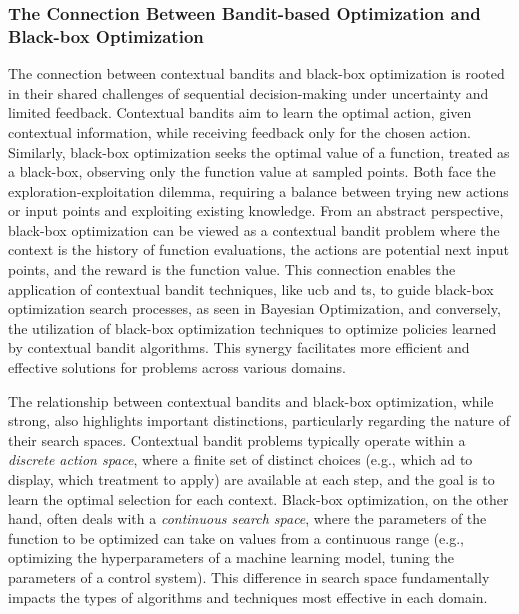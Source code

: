 \subsubsection{The Connection Between Bandit-based Optimization and Black-box Optimization}
The connection between contextual bandits and black-box optimization is rooted in their shared challenges of sequential decision-making under uncertainty and limited feedback. Contextual bandits aim to learn the optimal action, given contextual information, while receiving feedback only for the chosen action. Similarly, black-box optimization seeks the optimal value of a function, treated as a black-box, observing only the function value at sampled points. Both face the exploration-exploitation dilemma, requiring a balance between trying new actions or input points and exploiting existing knowledge. From an abstract perspective, black-box optimization can be viewed as a contextual bandit problem where the context is the history of function evaluations, the actions are potential next input points, and the reward is the function value. This connection enables the application of contextual bandit techniques, like \acl{ucb} and \acl{ts}, to guide black-box optimization search processes, as seen in Bayesian Optimization, and conversely, the utilization of black-box optimization techniques to optimize policies learned by contextual bandit algorithms. This synergy facilitates more efficient and effective solutions for problems across various domains.

The relationship between contextual bandits and black-box optimization, while strong, also highlights important distinctions, particularly regarding the nature of their search spaces. Contextual bandit problems typically operate within a \textit{discrete action space}, where a finite set of distinct choices (e.g., which ad to display, which treatment to apply) are available at each step, and the goal is to learn the optimal selection for each context. Black-box optimization, on the other hand, often deals with a \textit{continuous search space}, where the parameters of the function to be optimized can take on values from a continuous range (e.g., optimizing the hyperparameters of a machine learning model, tuning the parameters of a control system). This difference in search space fundamentally impacts the types of algorithms and techniques most effective in each domain. 


